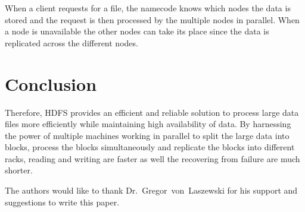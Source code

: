 When a client requests for a file, the namecode knows which nodes the
data is stored and the request is then processed by the multiple
nodes in parallel. When a node is unavailable the other nodes can
take its place since the data is replicated across the different
nodes. 

\section {Conclusion}

Therefore, HDFS provides an efficient and reliable solution to
process large data files more efficiently while maintaining high
availability of data. By harnessing the  power of multiple machines
working in parallel to split the large data into blocks, process the
blocks simultaneously and replicate the blocks into different racks,
reading and writing are faster as well the recovering from failure
are much shorter.

\begin{acks}
  The authors would like to thank Dr.~Gregor~von~Laszewski for his
  support and suggestions to write this paper.
\end{acks}


 